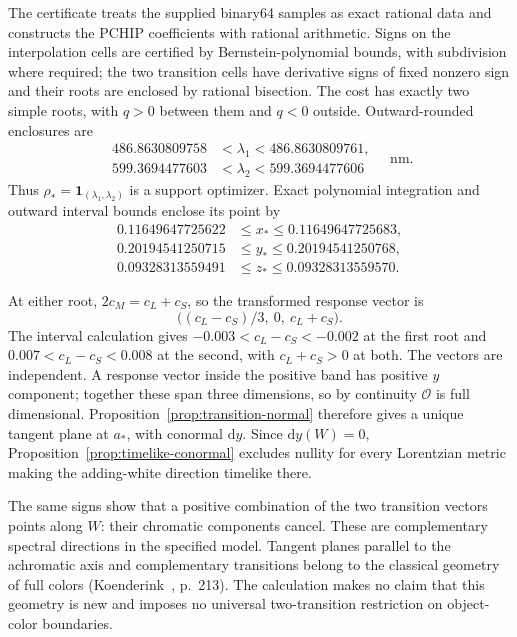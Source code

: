 \documentclass[11pt,letterpaper]{article}
\theoremstyle{plain}
\newcommand{\dd}{\mathrm{d}}
\begin{document}
The certificate treats the supplied binary64 samples as exact rational data and constructs the PCHIP coefficients with rational arithmetic. Signs on the interpolation cells are certified by Bernstein-polynomial bounds, with subdivision where required; the two transition cells have derivative signs of fixed nonzero sign and their roots are enclosed by rational bisection. The cost has exactly two simple roots, with $q>0$ between them and $q<0$ outside. Outward-rounded enclosures are
\begin{equation}
 \begin{aligned}
 486.8630809758&<\lambda_1<486.8630809761,\\
 599.3694477603&<\lambda_2<599.3694477606
 \end{aligned}
 \quad\text{nm}.
 \label{eq:object-roots}
\end{equation}
Thus $\rho_*=\mathbf1_{(\lambda_1,\lambda_2)}$ is a support optimizer. Exact polynomial integration and outward interval bounds enclose its point by
\begin{equation}
 \begin{aligned}
 0.11649647725622&\leq x_*\leq0.11649647725683,\\
 0.20194541250715&\leq y_*\leq0.20194541250768,\\
 0.09328313559491&\leq z_*\leq0.09328313559570.
 \end{aligned}
 \label{eq:object-point}
\end{equation}

At either root, $2c_M=c_L+c_S$, so the transformed response vector is
\begin{equation}
 \bigl((c_L-c_S)/3,\ 0,\ c_L+c_S\bigr).
 \label{eq:transition-vector}
\end{equation}
The interval calculation gives $-0.003<c_L-c_S<-0.002$ at the first root and $0.007<c_L-c_S<0.008$ at the second, with $c_L+c_S>0$ at both. The vectors are independent. A response vector inside the positive band has positive $y$ component; together these span three dimensions, so by continuity $\mathcal O$ is full dimensional. Proposition~\ref{prop:transition-normal} therefore gives a unique tangent plane at $a_*$, with conormal $\dd y$. Since $\dd y(W)=0$, Proposition~\ref{prop:timelike-conormal} excludes nullity for every Lorentzian metric making the adding-white direction timelike there.

The same signs show that a positive combination of the two transition vectors points along $W$: their chromatic components cancel. These are complementary spectral directions in the specified model. Tangent planes parallel to the achromatic axis and complementary transitions belong to the classical geometry of full colors (Koenderink~\cite{Koenderink2010}, p.~213). The calculation makes no claim that this geometry is new and imposes no universal two-transition restriction on object-color boundaries.
\end{document}
